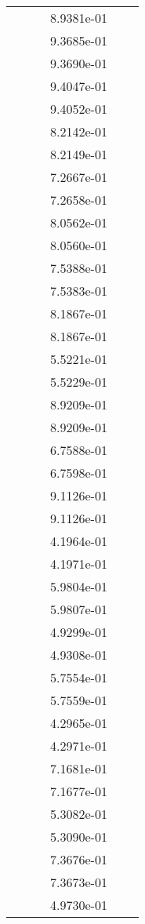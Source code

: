 \begin{xltabular}{\textwidth}{r|rS[table-format=1.3e+2]S[table-format=1.4e+2]S[table-format=1.4e+2]S[table-format=-1.5]}
&  &  & 8.9381e-01 & & \\
&  &  & 9.3685e-01 & & \\
&  &  & 9.3690e-01 & & \\
&  &  & 9.4047e-01 & & \\
&  &  & 9.4052e-01 & & \\
&  &  & 8.2142e-01 & & \\
&  &  & 8.2149e-01 & & \\
&  &  & 7.2667e-01 & & \\
&  &  & 7.2658e-01 & & \\
&  &  & 8.0562e-01 & & \\
&  &  & 8.0560e-01 & & \\
&  &  & 7.5388e-01 & & \\
&  &  & 7.5383e-01 & & \\
&  &  & 8.1867e-01 & & \\
&  &  & 8.1867e-01 & & \\
&  &  & 5.5221e-01 & & \\
&  &  & 5.5229e-01 & & \\
&  &  & 8.9209e-01 & & \\
&  &  & 8.9209e-01 & & \\
&  &  & 6.7588e-01 & & \\
&  &  & 6.7598e-01 & & \\
&  &  & 9.1126e-01 & & \\
&  &  & 9.1126e-01 & & \\
&  &  & 4.1964e-01 & & \\
&  &  & 4.1971e-01 & & \\
&  &  & 5.9804e-01 & & \\
&  &  & 5.9807e-01 & & \\
&  &  & 4.9299e-01 & & \\
&  &  & 4.9308e-01 & & \\
&  &  & 5.7554e-01 & & \\
&  &  & 5.7559e-01 & & \\
&  &  & 4.2965e-01 & & \\
&  &  & 4.2971e-01 & & \\
&  &  & 7.1681e-01 & & \\
&  &  & 7.1677e-01 & & \\
&  &  & 5.3082e-01 & & \\
&  &  & 5.3090e-01 & & \\
&  &  & 7.3676e-01 & & \\
&  &  & 7.3673e-01 & & \\
&  &  & 4.9730e-01 & & \\

\end{xltabular}

